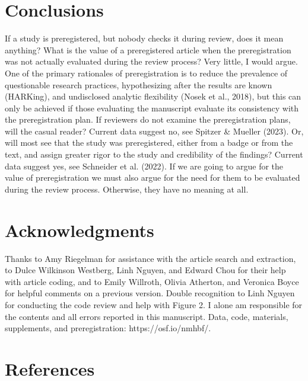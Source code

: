 \documentclass[authordate, empirical]{jote-new-article}
\begin{document}
	\section{\textbf{Conclusions}}



	If a study is preregistered, but nobody checks it during review, does it mean anything? What is the value of a preregistered article when the preregistration was not actually evaluated during the review process? Very little, I would argue. One of the primary rationales of preregistration is to reduce the prevalence of questionable research practices, hypothesizing after the results are known (HARKing), and undisclosed analytic flexibility (Nosek et al., 2018), but this can only be achieved if those evaluating the manuscript evaluate its consistency with the preregistration plan. If reviewers do not examine the preregistration plans, will the casual reader? Current data suggest no, see Spitzer \& Mueller (2023). Or, will most see that the study was preregistered, either from a badge or from the text, and assign greater rigor to the study and credibility of the findings? Current data suggest yes, see Schneider et al. (2022). If we are going to argue for the value of preregistration we must also argue for the need for them to be evaluated during the review process. Otherwise, they have no meaning at all.



	\section{\textbf{Acknowledgments}}



	Thanks to Amy Riegelman for assistance with the article search and extraction, to Dulce Wilkinson Westberg, Linh Nguyen, and Edward Chou for their help with article coding, and to Emily Willroth, Olivia Atherton, and Veronica Boyce for helpful comments on a previous version. Double recognition to Linh Nguyen for conducting the code review and help with Figure 2. I alone am responsible for the contents and all errors reported in this manuscript. Data, code, materials, supplements, and preregistration: https://osf.io/nmhbf/.







	\section{\textbf{References}}
\end{document}
